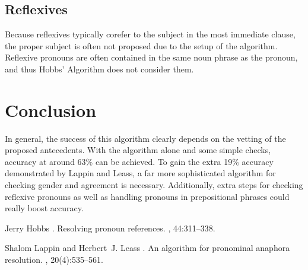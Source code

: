 \documentclass[11pt]{article}
\begin{document}
\subsection{Reflexives}
Because reflexives typically corefer to the subject in the most immediate clause, the proper subject is often not proposed due to the setup of the algorithm. Reflexive pronouns are often contained in the same noun phrase as the pronoun, and thus Hobbs' Algorithm does not consider them.

\section{Conclusion}
In general, the success of this algorithm clearly depends on the vetting of the proposed antecedents. With the algorithm alone and some simple checks, accuracy at around 63\% can be achieved. To gain the extra 19\% accuracy demonstrated by Lappin and Leass, a far more sophisticated algorithm for checking gender and agreement is necessary. Additionally, extra steps for checking reflexive pronouns as well as handling pronouns in prepositional phrases could really boost accuracy. 


%
%

\begin{thebibliography}{}

Jerry Hobbs
.
\newblock Resolving pronoun references.
, 44:311--338.

Shalom Lappin and Herbert~J. Leass
.
\newblock An algorithm for pronominal anaphora
resolution.
, 20(4):535--561.


\end{thebibliography}
\end{document}
